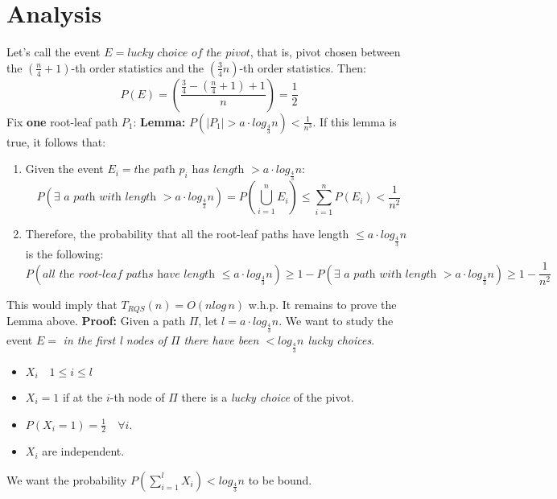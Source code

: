 \section{Analysis}
Let's call the event $E = \textit{lucky choice of the pivot}$, that is, pivot chosen between the $(\frac{n}{4} + 1)$-th order statistics and the $(\frac{3}{4}n)$-th order statistics. Then:
\[P(E) = \left(\frac{\frac{3}{4} - (\frac{n}{4} + 1) + 1}{n}\right) = \frac{1}{2}\]
Fix \textbf{one} root-leaf path $P_1$:\newline\newline
\textbf{Lemma:} $P(|P_1| > a \cdot log_{\frac{4}{3}}n) < \frac{1}{n^3}$.\newline\newline
If this lemma is true, it follows that:
\begin{enumerate}
    \item Given the event $E_i = \textit{the path $p_i$ has length } > a \cdot log_{\frac{4}{3}}n$:
    \[P(\exists \textit{ a path with length } > a \cdot log_{\frac{4}{3}}n) = P\left(\bigcup_{i=1}^n E_i\right) \leq \sum_{i=1}^n P(E_i) < \frac{1}{n^2}\]

    \item Therefore, the probability that all the root-leaf paths have length $\leq a \cdot log_{\frac{4}{3}}n$ is the following:
    \[P(\textit{all the root-leaf paths have length $\leq a \cdot log_{\frac{4}{3}}n$}) \geq 1 - P(\exists \textit{ a path with length } > a \cdot log_{\frac{4}{3}}n) \geq 1 - \frac{1}{n^2}\]
\end{enumerate}
This would imply that $T_{RQS}(n) = O(nlog\,n)$ w.h.p.\newline\newline
It remains to prove the Lemma above.\newline\newline
\textbf{Proof:} Given a path $\Pi$, let $l = a \cdot log_{\frac{4}{3}}n$. We want to study the event $E =$ \textit{in the first l nodes of $\Pi$ there have been $< log_{\frac{4}{3}}n$ lucky choices}.
\begin{itemize}
    \item $X_i \quad 1 \leq i \leq l$
    \item $X_i = 1$ if at the $i$-th node of $\Pi$ there is a \textit{lucky choice} of the pivot. 
    \item $P(X_i = 1) = \frac{1}{2} \quad \forall i$.
    \item $X_i$ are independent.
\end{itemize}
We want the probability $P(\sum_{i=1}^l X_i) < log_{\frac{4}{3}}n$ to be bound.\newline\newline
